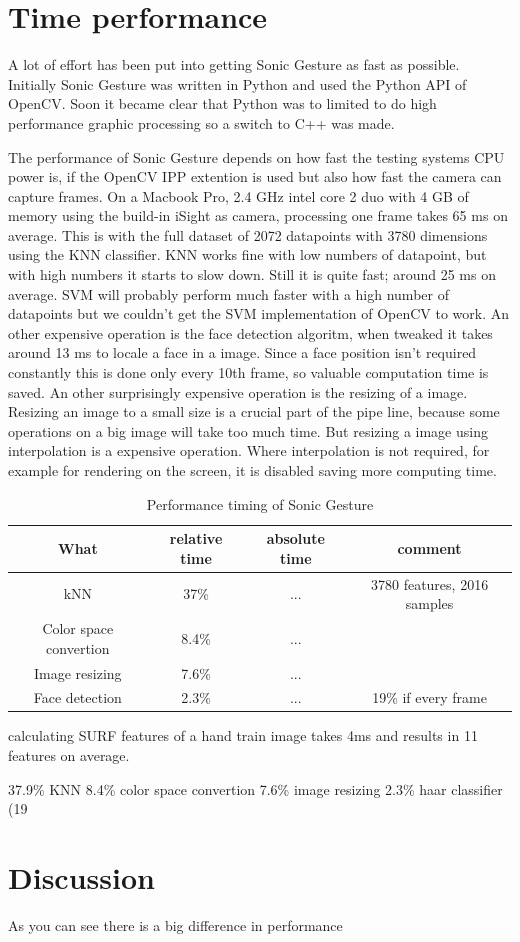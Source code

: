 \section{Time performance}
A lot of effort has been put into getting Sonic Gesture as fast as possible. Initially Sonic Gesture was written in Python and used the Python API of OpenCV. Soon it became clear that Python was to limited to do high performance graphic processing so a switch to C++ was made. 

The performance of Sonic Gesture depends on how fast the testing systems CPU power is, if the OpenCV IPP extention is used but also how fast the camera can capture frames. On a Macbook Pro, 2.4 GHz intel core 2 duo with 4 GB of memory using the build-in iSight as camera, processing one frame takes 65 ms on average. This is with the full dataset of 2072 datapoints with 3780 dimensions using the KNN classifier. KNN works fine with low numbers of datapoint, but with high numbers it starts to slow down. Still it is quite fast; around 25 ms on average. SVM will probably perform much faster with a high number of datapoints but we couldn't get the SVM implementation of OpenCV to work. An other expensive operation is the face detection algoritm, when tweaked it takes around 13 ms to locale a face in a image. Since a face position isn't required constantly this is done only every 10th frame, so valuable computation time is saved. An other surprisingly expensive operation is the resizing of a image. Resizing an image to a small size is a crucial part of the pipe line, because some operations on a big image will take too much time. But resizing a image using interpolation is a expensive operation. Where interpolation is not required, for example for rendering on the screen, it is disabled saving more computing time. 



\begin{table}
\centering
\begin{tabular}{cccc}
What & relative time & absolute time & comment \\
\hline
kNN & 37\% & ... & 3780 features, 2016 samples \\
Color space convertion & 8.4\% & ... & \\
Image resizing & 7.6\% & ... & \\
Face detection & 2.3\% & ... &  19\% if every frame \\
\end{tabular}
\caption{Performance timing of Sonic Gesture}
\end{table}

calculating SURF features of a hand train image takes 4ms and results in 11 features on average.



37.9\% KNN
8.4\% color space convertion
7.6\% image resizing
2.3\% haar classifier (19%

\section{Discussion}
As you can see there is a big difference in performance



